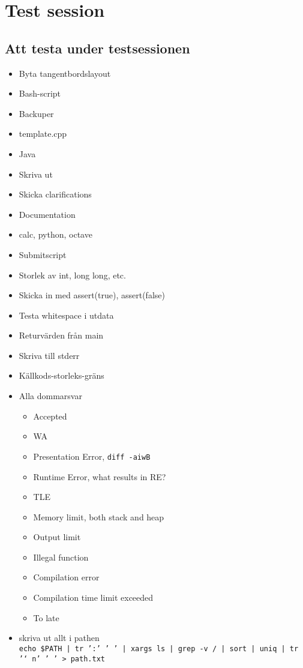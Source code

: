 
\appendix

\chapter{Test session}

\section{Att testa under testsessionen}
\begin{itemize}
	\item Byta tangentbordslayout
	\item Bash-script
	\item Backuper
	\item template.cpp
	\item Java
	\item Skriva ut
	\item Skicka clarifications
	\item Documentation
	\item calc, python, octave
	\item Submitscript
	\item Storlek av int, long long, etc.
	\item Skicka in med assert(true), assert(false)
	\item Testa whitespace i utdata
	\item Returvärden från main
	\item Skriva till stderr
	\item Källkods-storleks-gräns
	\item Alla dommarsvar
		\begin{itemize}
 			\item Accepted
 			\item WA
			\item Presentation Error, \texttt{diff -aiwB}
 			\item Runtime Error, what results in RE?
 			\item TLE
 			\item Memory limit, both stack and heap
 			\item Output limit
 			\item Illegal function
 			\item Compilation error
 			\item Compilation time limit exceeded
 			\item To late
		\end{itemize}
	\item skriva ut allt i pathen\\
		\texttt{echo \$PATH | tr ':' ' ' | xargs ls | grep -v / | sort | uniq | tr '\char`\\n' ' ' > path.txt}
\end{itemize}

